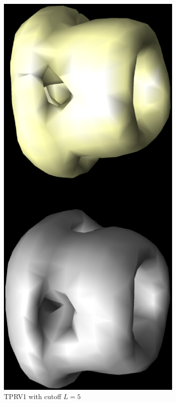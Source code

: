 \documentclass[9pt,twocolumn,twoside,lineno]{pnas-new}
\begin{document}
\begin{figure}[h]
	\centering
	\begin{subfigure}[h]{0.45\textwidth}
		\centering
		\includegraphics[angle=270, width=.7\textwidth]{TRPV1_rec.eps}
		\caption{TPRV1 with cutoff $L=5$}\label{fig:TRPV1_recon}
	\end{subfigure}
	\hfill
	\begin{subfigure}[h]{0.45\textwidth}
		\centering

\end{subfigure}
\end{figure}
\end{document}
